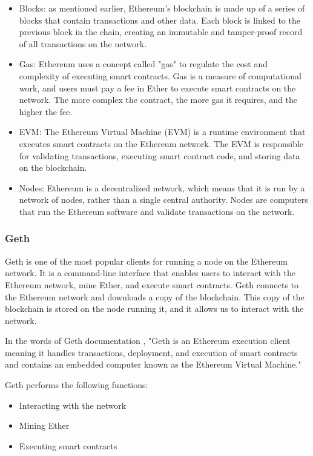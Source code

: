 \documentclass{article}
\begin{document}
\begin{itemize}
    \item Blocks: as mentioned earlier, Ethereum's blockchain is made up of a series of blocks that contain transactions and other data. Each block is linked to the previous block in the chain, creating an immutable and tamper-proof record of all transactions on the network.
    \item Gas: Ethereum uses a concept called "gas" to regulate the cost and complexity of executing smart contracts. Gas is a measure of computational work, and users must pay a fee in Ether to execute smart contracts on the network. The more complex the contract, the more gas it requires, and the higher the fee.
    \item EVM: The Ethereum Virtual Machine (EVM) is a runtime environment that executes smart contracts on the Ethereum network. The EVM is responsible for validating transactions, executing smart contract code, and storing data on the blockchain.
    \item Nodes: Ethereum is a decentralized network, which means that it is run by a network of nodes, rather than a single central authority. Nodes are computers that run the Ethereum software and validate transactions on the network.
\end{itemize}

\subsubsection{Geth}
Geth is one of the most popular clients for running a node on the Ethereum network. It is a command-line interface that enables users to interact with the Ethereum network, mine Ether, and execute smart contracts. Geth connects to the Ethereum network and downloads a copy of the blockchain. This copy of the blockchain is stored on the node running it, and it allows us to interact with the network.

In the words of Geth documentation \cite{gethDocumentation}, "Geth is an Ethereum execution client meaning it handles transactions, deployment, and execution of smart contracts and contains an embedded computer known as the Ethereum Virtual Machine."

Geth performs the following functions:

\begin{itemize}
    \item Interacting with the network
    \item Mining Ether
    \item Executing smart contracts
\end{itemize}
\end{document}
